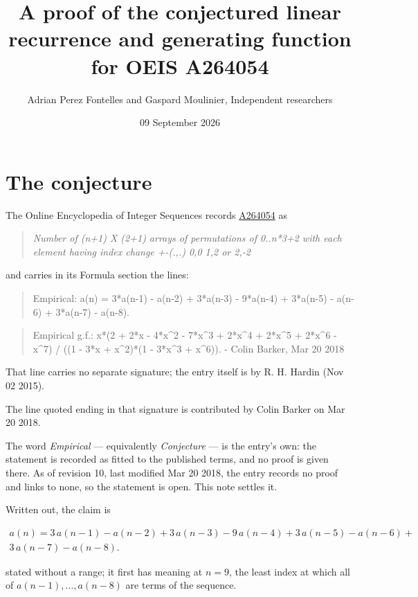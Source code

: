 \documentclass[11pt]{article}
\title{A proof of the conjectured linear recurrence and generating function for OEIS A264054}
\author{Adrian Perez Fontelles and Gaspard Moulinier, Independent researchers}
\date{09 September 2026}
\theoremstyle{definition}
\begin{document}
\maketitle
\section{The conjecture}

The Online Encyclopedia of Integer Sequences records \href{https://oeis.org/A264054}{A264054} as

\begin{quote}\itshape Number of (n+1) X (2+1) arrays of permutations of 0..n*3+2 with each element having index change +-(.,.) 0,0 1,2 or 2,-2\end{quote}

and carries in its Formula section the lines:

\begin{quote}\ttfamily Empirical: a(n) = 3*a(n-1) - a(n-2) + 3*a(n-3) - 9*a(n-4) + 3*a(n-5) - a(n-6) + 3*a(n-7) - a(n-8).\end{quote}

\begin{quote}\ttfamily Empirical g.f.: x*(2 + 2*x - 4*x\textasciicircum{}2 - 7*x\textasciicircum{}3 + 2*x\textasciicircum{}4 + 2*x\textasciicircum{}5 + 2*x\textasciicircum{}6 - x\textasciicircum{}7) / ((1 - 3*x + x\textasciicircum{}2)*(1 - 3*x\textasciicircum{}3 + x\textasciicircum{}6)). - Colin Barker, Mar 20 2018\end{quote}

That line carries no separate signature; the entry itself is by R. H. Hardin (Nov 02 2015).

The line quoted ending in that signature is contributed by Colin Barker on Mar 20 2018.

The word {\itshape Empirical} --- equivalently {\itshape Conjecture} --- is the entry's own: the statement is recorded as fitted to the published terms, and no proof is given there. As of revision 10, last modified Mar 20 2018, the entry records no proof and links to none, so the statement is open. This note settles it.

Written out, the claim is

\begin{multline*} a(n) = 3\,a(n-1) - a(n-2) + 3\,a(n-3) - 9\,a(n-4) + 3\,a(n-5) - a(n-6) + \\ 3\,a(n-7) - a(n-8). \end{multline*}

stated without a range; it first has meaning at $n = 9$, the least index at which all of $a(n-1),\dots,a(n-8)$ are terms of the sequence.
\end{document}
